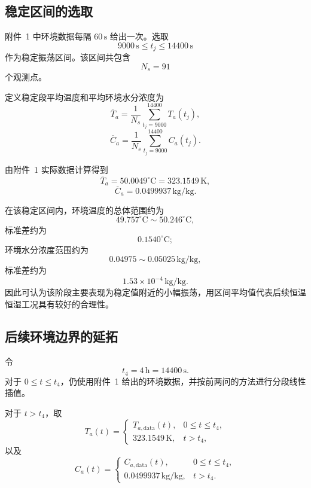 \documentclass[UTF8,a4paper,12pt]{ctexart}
\begin{document}
\subsection{稳定区间的选取}

附件~1 中环境数据每隔 $60\,\mathrm{s}$ 给出一次。选取
\[
9000\,\mathrm{s}\le t_j\le14400\,\mathrm{s}
\]
作为稳定振荡区间。该区间共包含
\[
N_s=91
\]
个观测点。

定义稳定段平均温度和平均环境水分浓度为
\begin{equation}
    \overline{T}_a
    =
    \frac{1}{N_s}
    \sum_{t_j=9000}^{14400}T_a(t_j),
    \label{eq:Ta_mean}
\end{equation}
\begin{equation}
    \overline{C}_a
    =
    \frac{1}{N_s}
    \sum_{t_j=9000}^{14400}C_a(t_j).
    \label{eq:Ca_mean}
\end{equation}

由附件~1 实际数据计算得到
\begin{equation}
    \overline{T}_a
    =
    50.0049^\circ\mathrm{C}
    =
    323.1549\,\mathrm{K},
    \label{eq:Ta_value}
\end{equation}
\begin{equation}
    \overline{C}_a
    =
    0.0499937\,\mathrm{kg/kg}.
    \label{eq:Ca_value}
\end{equation}

在该稳定区间内，环境温度的总体范围约为
\[
49.757^\circ\mathrm{C}
\sim
50.246^\circ\mathrm{C},
\]
标准差约为
\[
0.1540^\circ\mathrm{C};
\]
环境水分浓度范围约为
\[
0.04975
\sim
0.05025\,\mathrm{kg/kg},
\]
标准差约为
\[
1.53\times10^{-4}\,\mathrm{kg/kg}.
\]
因此可认为该阶段主要表现为稳定值附近的小幅振荡，用区间平均值代表后续恒温恒湿工况具有较好的合理性。

\subsection{后续环境边界的延拓}

令
\[
t_4=4\,\mathrm{h}=14400\,\mathrm{s}.
\]
对于 $0\le t\le t_4$，仍使用附件~1 给出的环境数据，并按前两问的方法进行分段线性插值。

对于 $t>t_4$，取
\begin{equation}
T_a(t)=
\begin{cases}
T_{a,\mathrm{data}}(t), & 0\le t\le t_4,\\[4pt]
323.1549\,\mathrm{K}, & t>t_4,
\end{cases}
\label{eq:Ta_piecewise}
\end{equation}
以及
\begin{equation}
C_a(t)=
\begin{cases}
C_{a,\mathrm{data}}(t), & 0\le t\le t_4,\\[4pt]
0.0499937\,\mathrm{kg/kg}, & t>t_4.
\end{cases}
\label{eq:Ca_piecewise}
\end{equation}
\end{document}
